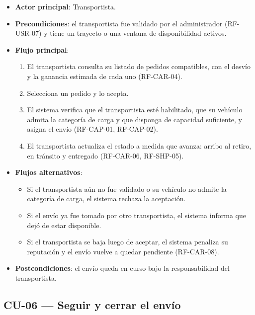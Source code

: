 {\begin{itemize}[leftmargin=2em]
    \item \textbf{Actor principal}: Transportista.
    \item \textbf{Precondiciones}: el transportista fue validado por el administrador (RF-USR-07) y tiene un trayecto o una ventana de disponibilidad activos.
    \item \textbf{Flujo principal}:
    \begin{enumerate}[leftmargin=2em]
        \item El transportista consulta su listado de pedidos compatibles, con el desvío y la ganancia estimada de cada uno (RF-CAR-04).
        \item Selecciona un pedido y lo acepta.
        \item El sistema verifica que el transportista esté habilitado, que su vehículo admita la categoría de carga y que disponga de capacidad suficiente, y asigna el envío (RF-CAP-01, RF-CAP-02).
        \item El transportista actualiza el estado a medida que avanza: arribo al retiro, en tránsito y entregado (RF-CAR-06, RF-SHP-05).
    \end{enumerate}
    \item \textbf{Flujos alternativos}:
    \begin{itemize}[leftmargin=2em]
        \item[2a.] Si el transportista aún no fue validado o su vehículo no admite la categoría de carga, el sistema rechaza la aceptación.
        \item[2b.] Si el envío ya fue tomado por otro transportista, el sistema informa que dejó de estar disponible.
        \item[4a.] Si el transportista se baja luego de aceptar, el sistema penaliza su reputación y el envío vuelve a quedar pendiente (RF-CAR-08).
    \end{itemize}
    \item \textbf{Postcondiciones}: el envío queda en curso bajo la responsabilidad del transportista.
\end{itemize}

\subsection{CU-06 --- Seguir y cerrar el envío}

}
